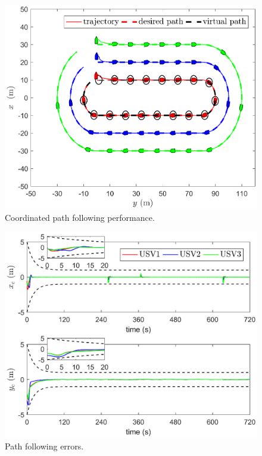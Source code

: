 \documentclass[english]{cccconf}
\begin{document}
\begin{figure}[!htb]
	\centering
	\includegraphics[width=\hsize]{map.eps}
	\caption{Coordinated path following performance.}
	\label{performance}
\end{figure}

\begin{figure}[!htb]
	\centering
	\includegraphics[width=\hsize]{path_following_errors.eps}
	\caption{Path following errors.}
	\label{path following errors}
\end{figure}
\end{document}
